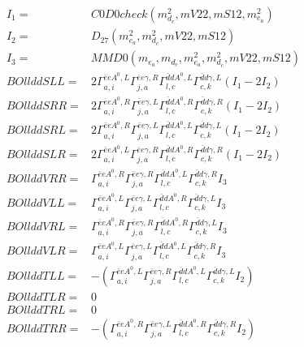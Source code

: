 \documentclass[A4,landscape]{article}
\begin{document}
\begin{align} 
I_1 = & C0D0check(m^2_{d_{{c}}}, mV22, mS12, m^2_{e_{{a}}}) \\ 
I_2 = & D_{27}(m^2_{e_{{a}}}, m^2_{d_{{c}}}, mV22, mS12) \\ 
I_3 = & MMD0(m_{e_{{a}}}, m_{d_{{c}}}, m^2_{e_{{a}}}, m^2_{d_{{c}}}, mV22, mS12) \\ 
  BOllddSLL= & 2  \Gamma^{\bar{e}e A^0 ,L}_{a, i} \Gamma^{\bar{e}e \gamma ,R}_{j, a} \Gamma^{\bar{d}d A^0 ,L}_{l, c} \Gamma^{\bar{d}d \gamma ,L}_{c, k} (I_1 - 2 I_2) \\ 
  BOllddSRR= & 2  \Gamma^{\bar{e}e A^0 ,R}_{a, i} \Gamma^{\bar{e}e \gamma ,L}_{j, a} \Gamma^{\bar{d}d A^0 ,R}_{l, c} \Gamma^{\bar{d}d \gamma ,R}_{c, k} (I_1 - 2 I_2) \\ 
  BOllddSRL= & 2  \Gamma^{\bar{e}e A^0 ,R}_{a, i} \Gamma^{\bar{e}e \gamma ,L}_{j, a} \Gamma^{\bar{d}d A^0 ,L}_{l, c} \Gamma^{\bar{d}d \gamma ,L}_{c, k} (I_1 - 2 I_2) \\ 
  BOllddSLR= & 2  \Gamma^{\bar{e}e A^0 ,L}_{a, i} \Gamma^{\bar{e}e \gamma ,R}_{j, a} \Gamma^{\bar{d}d A^0 ,R}_{l, c} \Gamma^{\bar{d}d \gamma ,R}_{c, k} (I_1 - 2 I_2) \\ 
  BOllddVRR= &  \Gamma^{\bar{e}e A^0 ,R}_{a, i} \Gamma^{\bar{e}e \gamma ,R}_{j, a} \Gamma^{\bar{d}d A^0 ,L}_{l, c} \Gamma^{\bar{d}d \gamma ,R}_{c, k} I_3 \\ 
  BOllddVLL= &  \Gamma^{\bar{e}e A^0 ,L}_{a, i} \Gamma^{\bar{e}e \gamma ,L}_{j, a} \Gamma^{\bar{d}d A^0 ,R}_{l, c} \Gamma^{\bar{d}d \gamma ,L}_{c, k} I_3 \\ 
  BOllddVRL= &  \Gamma^{\bar{e}e A^0 ,R}_{a, i} \Gamma^{\bar{e}e \gamma ,R}_{j, a} \Gamma^{\bar{d}d A^0 ,R}_{l, c} \Gamma^{\bar{d}d \gamma ,L}_{c, k} I_3 \\ 
  BOllddVLR= &  \Gamma^{\bar{e}e A^0 ,L}_{a, i} \Gamma^{\bar{e}e \gamma ,L}_{j, a} \Gamma^{\bar{d}d A^0 ,L}_{l, c} \Gamma^{\bar{d}d \gamma ,R}_{c, k} I_3 \\ 
  BOllddTLL= & -( \Gamma^{\bar{e}e A^0 ,L}_{a, i} \Gamma^{\bar{e}e \gamma ,R}_{j, a} \Gamma^{\bar{d}d A^0 ,L}_{l, c} \Gamma^{\bar{d}d \gamma ,L}_{c, k} I_2) \\ 
  BOllddTLR= & 0 \\ 
  BOllddTRL= & 0 \\ 
  BOllddTRR= & -( \Gamma^{\bar{e}e A^0 ,R}_{a, i} \Gamma^{\bar{e}e \gamma ,L}_{j, a} \Gamma^{\bar{d}d A^0 ,R}_{l, c} \Gamma^{\bar{d}d \gamma ,R}_{c, k} I_2) \\ 
\end{align} 
\end{document}
